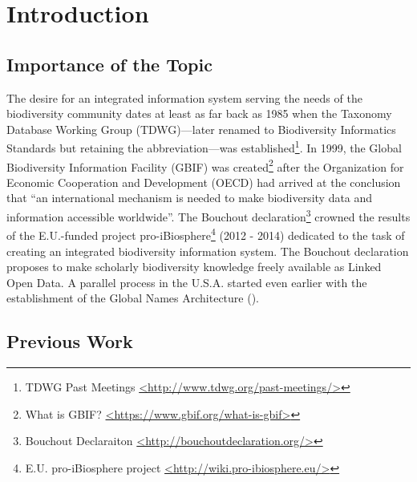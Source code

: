 \chapter{Introduction}
\label{chapter-introduction} 
\newcommand{\keyword}[1]{\textbf{#1}}
\newcommand{\tabhead}[1]{\textbf{#1}}
\newcommand{\code}[1]{\texttt{#1}}
\newcommand{\file}[1]{\texttt{\bfseries#1}}
\newcommand{\option}[1]{\texttt{\itshape#1}}
\section{Importance of the Topic}


The desire for an integrated information system serving the needs of the biodiversity community dates at least as far back as 1985 when the Taxonomy Database Working Group (TDWG)---later renamed to Biodiversity Informatics Standards but retaining the abbreviation---was established\footnote{TDWG Past Meetings \href{http://www.tdwg.org/past-meetings/}{<http://www.tdwg.org/past-meetings/>}}. In 1999, the Global Biodiversity Information Facility (GBIF) was created\footnote{What is GBIF? \href{https://www.gbif.org/what-is-gbif}{<https://www.gbif.org/what-is-gbif>}} after the Organization for Economic Cooperation and Development (OECD) had arrived at the conclusion that ``an international mechanism is needed to make biodiversity data and information accessible worldwide''. The Bouchout declaration\footnote{Bouchout Declaraiton \href{http://bouchoutdeclaration.org/}{<http://bouchoutdeclaration.org/>}} crowned the results of the E.U.-funded project pro-iBiosphere\footnote{E.U. pro-iBiosphere project \href{http://wiki.pro-ibiosphere.eu/}{<http://wiki.pro-ibiosphere.eu/>}} (2012 - 2014) dedicated to the task of creating an integrated biodiversity information system. The Bouchout declaration proposes to make scholarly biodiversity knowledge freely available as Linked Open Data. A parallel process in the U.S.A. started even earlier with the establishment of the Global Names Architecture (\cite{patterson_names_2010,pyle_towards_2016}).

\section{Previous Work}

